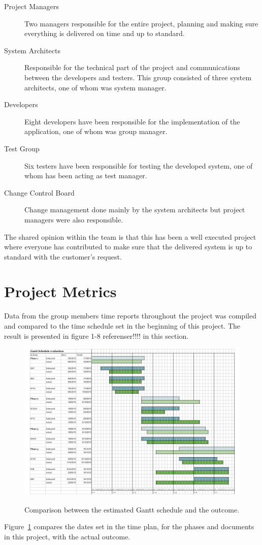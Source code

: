 \documentclass[a4paper]{article}
\begin{document}
\begin{description}
\item[Project Managers] Two managers responsible for the entire project, planning and making sure everything is delivered on time and up to standard.
\item[System Architects] Responsible for the technical part of the project and communications between the developers and testers. This group consisted of three system architects, one of whom was system manager.
\item[Developers] Eight developers have been responsible for the implementation of the application, one of whom was group manager.
\item[Test Group] Six testers have been responsible for testing the developed system, one of whom has been acting as test manager.
\item[Change Control Board] Change management done mainly by the system architects but project managers were also responsible.
\end{description}

The shared opinion within the team is that this has been a well executed project where everyone has contributed to make sure that the delivered system is up to standard with the customer's request.  

\newpage
\section{Project Metrics}
\label{sec:metr}
Data from the group members time reports throughout the project was compiled and compared to the time schedule set in the beginning of this project. The result is presented in figure 1-8 referenser!!!! in this section. 


\begin{figure}[h!]
\includegraphics[width=1.1\textwidth]{gantt.jpg}
\label{fig:gantt}
\caption{Comparison between the estimated Gantt schedule and the outcome.}
\end{figure}
Figure~\ref{fig:gantt} compares the dates set in the time plan, for the phases and documents in this project, with the actual outcome.
\end{document}
